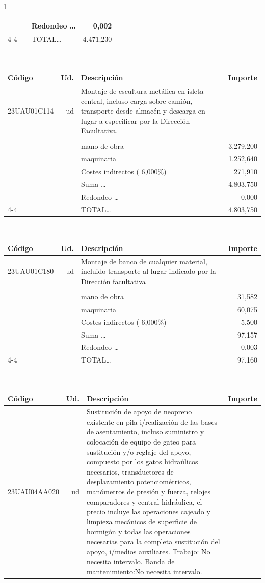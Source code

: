 \documentclass{book}%
\begin{document}
\begin{longtable}{l}
\begin{tabular}{l r p{60mm} r}
&&Redondeo \ldots&     0,002\\%
\cline{4-4}%
&&TOTAL\ldots& 4.471,230\\%
\end{tabular}\\%
\begin{tabular}{l r p{60mm} r}%
Código&Ud.&Descripción&Importe\\%
\hline%
23UAU01C114&ud&Montaje de escultura metálica en isleta central, incluso carga sobre camión, transporte desde almacén y descarga en lugar a especificar por la Dirección Facultativa.&\\%
&&&\\%
&&mano de obra& 3.279,200\\%
&&maquinaria& 1.252,640\\%
&&Costes indirectos (     6,000\%)&   271,910\\%
&&Suma \ldots& 4.803,750\\%
&&Redondeo \ldots&    {-}0,000\\%
\cline{4-4}%
&&TOTAL\ldots& 4.803,750\\%
\end{tabular}\\%
\begin{tabular}{l r p{60mm} r}%
Código&Ud.&Descripción&Importe\\%
\hline%
23UAU01C180&ud&Montaje de banco de cualquier material, incluido transporte al lugar indicado por la Dirección facultativa&\\%
&&&\\%
&&mano de obra&    31,582\\%
&&maquinaria&    60,075\\%
&&Costes indirectos (     6,000\%)&     5,500\\%
&&Suma \ldots&    97,157\\%
&&Redondeo \ldots&     0,003\\%
\cline{4-4}%
&&TOTAL\ldots&    97,160\\%
\end{tabular}\\%
\begin{tabular}{l r p{60mm} r}%
Código&Ud.&Descripción&Importe\\%
\hline%
23UAU04AA020&ud&Sustitución de apoyo de neopreno existente en pila i/realización de las bases de asentamiento, incluso suministro y colocación de equipo de gateo para sustitución y/o reglaje del apoyo, compuesto por los gatos hidraúlicos necesarios, transductores de desplazamiento potenciométricos, manómetros de presión y fuerza, relojes comparadores y central hidráulica, el precio incluye las operaciones cajeado y limpieza mecánicos de superficie de hormigón y todas las operaciones necesarias para la completa sustitución del apoyo, i/medios auxiliares. Trabajo: No necesita intervalo. Banda de mantenimiento:No necesita intervalo.&\\%

\end{tabular}
\end{longtable}
\end{document}
